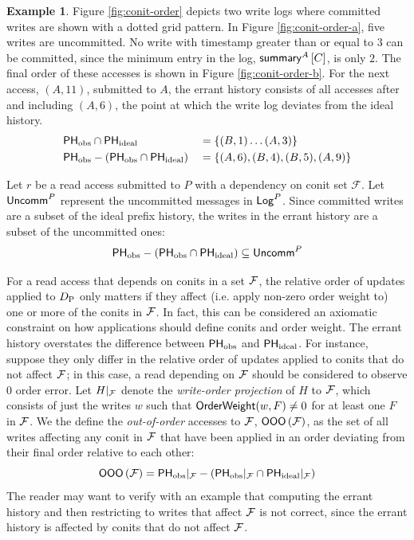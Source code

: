 \documentclass[]             %
{NASA}                       %
\theoremstyle{definition}
\newtheorem{example}[theorem]{Example}
\begin{document}
\begin{example}
  \label{ex:conit-order}
  Figure \ref{fig:conit-order} depicts two write logs where committed
  writes are shown with a dotted grid pattern. In Figure
  \ref{fig:conit-order-a}, five writes are uncommitted. No write with
  timestamp greater than or equal to $3$ can be committed, since the
  minimum entry in the log, $\mathsf{summary}^{A}\left[C\right]$, is only $2$. The final order
  of these accesses is shown in Figure \ref{fig:conit-order-b}. For
  the next access, $(A, 11)$, submitted to $A$, the errant history
  consists of all accesses after and including $(A, 6)$, the point at
  which the write log deviates from the ideal history.
  \begin{align*}
    &\mathsf{PH}_{\mathrm{obs}} \cap \mathsf{PH}_{\mathrm{ideal}} &&= \{ (B, 1) \ldots (A, 3) \} \\
    &\mathsf{PH}_{\mathrm{obs}} - \left(\mathsf{PH}_{\mathrm{obs}} \cap \mathsf{PH}_{\mathrm{ideal}}\right) &&= \{ (A, 6), (B, 4), (B, 5), (A, 9) \}
  \end{align*}
\end{example}

Let $r$ be a read access submitted to $P$ with a dependency on conit
set $\mathcal{F}$.  Let $\mathsf{Uncomm}^{P}$ represent the uncommitted
messages in $\mathsf{Log}^{P}$.  Since committed writes are a subset of the
ideal prefix history, the writes in the errant history are a subset of
the uncommitted ones:
\begin{equation}
  \mathsf{PH}_{\mathrm{obs}} - \left(\mathsf{PH}_{\mathrm{obs}} \cap \mathsf{PH}_{\mathrm{ideal}}\right) \subseteq \mathsf{Uncomm}^{P}
\end{equation}


For a read access that depends on conits in a set $\mathcal{F}$, the
relative order of updates applied to $D_{\textrm{P}}$ only matters if they affect
(i.e. apply non-zero order weight to) one or more of the conits in
$\mathcal{F}$. In fact, this can be considered an axiomatic constraint on
how applications should define conits and order weight. The errant
history overstates the difference between $\mathsf{PH}_{\mathrm{obs}}$ and $\mathsf{PH}_{\mathrm{ideal}}$. For
instance, suppose they only differ in the relative order of updates
applied to conits that do not affect $\mathcal{F}$; in this case, a read
depending on $\mathcal{F}$ should be considered to observe $0$ order
error. Let $H|_{\mathcal{F}}$ denote the \emph{write-order projection} of
$H$ to $\mathcal{F}$, which consists of just the writes $w$ such that
$\mathsf{OrderWeight}(w, F) \neq 0$ for at least one $F$ in $\mathcal{F}$. We the
define the \emph{out-of-order} accesses to $\mathcal{F}$,
$\mathsf{OOO}\left(\mathcal{F}\right)$, as the set of all writes affecting
any conit in $\mathcal{F}$ that have been applied in an order deviating
from their final order relative to each other:
\begin{equation}
  \mathsf{OOO}\left(\mathcal{F}\right)  = \mathsf{PH}_{\mathrm{obs}}|_{\mathcal{F}} - \left(\mathsf{PH}_{\mathrm{obs}}|_{\mathcal{F}} \cap \mathsf{PH}_{\mathrm{ideal}}|_{\mathcal{F}} \right)
\end{equation}
The reader may want to verify with an example that computing the
errant history and then restricting to writes that affect $\mathcal{F}$ is
not correct, since the errant history is affected by conits that do
not affect $\mathcal{F}$.
\end{document}
